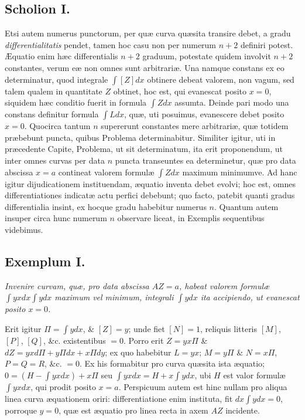 \subsection*{Scholion I.}
Etsi autem numerus punctorum, per quæ curva quæsita transire debet, a gradu \textit{differentialitatis} pendet, tamen hoc casu non per numerum $n+2$ definiri potest. Æquatio enim hæc differentialis $n+2$ graduum, potestate quidem involvit $n+2$ constantes, verum eæ non omnes sunt arbitrariæ. Una namque constans ex eo determinatur, quod integrale $\int[Z]dx$ obtinere debeat valorem, non vagum, sed talem qualem in quantitate $Z$ obtinet, hoc est, qui evanescat posito $x=0$, siquidem hæc conditio fuerit in formula $\int Zdx$ assumta. Deinde pari modo una constans definitur formula $\int Ldx$, quæ, uti posuimus, evanescere debet posito $x=0$. Quocirca tantum $n$ supererunt constantes mere arbitrariæ, quæ totidem præbebunt puncta, quibus Problema determinabitur. Similiter igitur, uti in præcedente Capite, Problema, ut sit determinatum, ita erit proponendum, ut inter omnes curvas per data $n$ puncta transeuntes ea determinetur, quæ pro data abscissa $x=a$ contineat valorem formulæ $\int Zdx$ maximum minimumve. Ad hanc igitur dijudicationem instituendam, æquatio inventa debet evolvi; hoc est, omnes differentiationes indicatæ actu perfici debebunt; quo facto, patebit quanti gradus differentialia insint, ex hocque gradu habebitur numerus $n$. Quantum autem insuper circa hunc numerum $n$ observare liceat, in Exemplis sequentibus videbimus.
\subsection*{Exemplum I.}
\textit{Invenire curvam, quæ, pro data abscissa $AZ=a$, habeat valorem formulæ $\int yxdx\int ydx$ maximum vel minimum, integrali $\int ydx$ ita accipiendo, ut evanescat posito $x=0$.}

Erit igitur $\Pi=\int ydx$, \& $[Z]=y$; unde fiet $[N]=1$, reliquis litteris $[M]$, $[P]$, $[Q]$, \&c. existentibus $=0$. Porro erit $Z=yx\Pi$ \& $dZ=yxd\Pi+y\Pi dx+x\Pi dy$; ex quo habebitur $L=yx$; $M=y\Pi$ \& $N=x\Pi$, $P=Q=R$, \&c.
$=0$. Ex his formabitur pro curva quæsita ista æquatio; $0=(H-\int yxdx)+x\Pi$ seu $\int yxdx=H+x\int ydx$, ubi $H$ est valor formulæ $\int yxdx$, qui prodit posito $x=a$. Perspicuum autem est hinc nullam pro aliqua linea curva æquationem oriri: differentiatione enim instituta, fit $dx\int ydx=0$, porroque $y=0$, quæ est æquatio pro linea recta in axem $AZ$ incidente.

